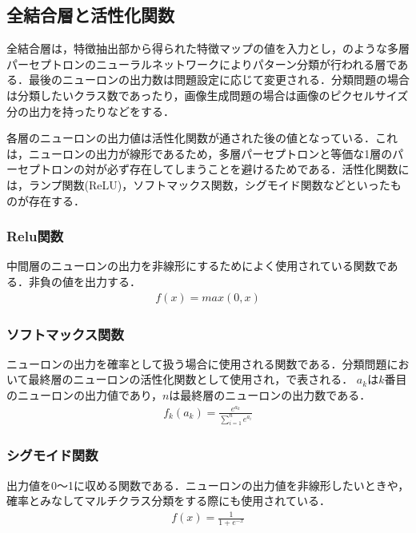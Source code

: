 \newpage
\subsection{全結合層と活性化関数}
全結合層は，特徴抽出部から得られた特徴マップの値を入力とし，のような多層パーセプトロンのニューラルネットワークによりパターン分類が行われる層である．最後のニューロンの出力数は問題設定に応じて変更される．分類問題の場合は分類したいクラス数であったり，画像生成問題の場合は画像のピクセルサイズ分の出力を持ったりなどをする．

各層のニューロンの出力値は活性化関数が通された後の値となっている．これは，ニューロンの出力が線形であるため，多層パーセプトロンと等価な1層のパーセプトロンの対が必ず存在してしまうことを避けるためである．活性化関数には，ランプ関数(ReLU)，ソフトマックス関数，シグモイド関数などといったものが存在する．


\subsubsection{Relu関数}
中間層のニューロンの出力を非線形にするためによく使用されている関数である．非負の値を出力する．
\begin{eqnarray}
	f(x) = max(0, x)
\end{eqnarray}

\subsubsection{ソフトマックス関数}
ニューロンの出力を確率として扱う場合に使用される関数である．分類問題において最終層のニューロンの活性化関数として使用され，で表される．
$a_k$は$k$番目のニューロンの出力値であり，$n$は最終層のニューロンの出力数である．
\begin{eqnarray}
	f_k(a_k) = \frac{e^{a_k}}{\displaystyle \sum_{i=1}^{n} e^{a_i}} \label{eq:softmax}
\end{eqnarray}

\subsubsection{シグモイド関数}
出力値を0～1に収める関数である．ニューロンの出力値を非線形したいときや，確率とみなしてマルチクラス分類をする際にも使用されている．
\begin{eqnarray}
	f(x) = \frac{1}{1+ e^{-x}}
\end{eqnarray}


\newpage
